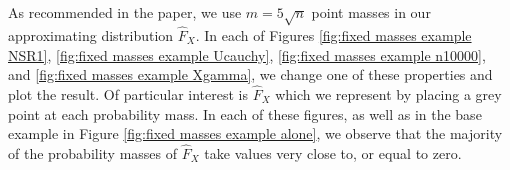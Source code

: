 	As recommended in the paper, we use $m = 5\sqrt{n}$ point masses in our approximating distribution $\hat{F}_X$. In each of Figures \ref{fig:fixed masses example NSR1}, \ref{fig:fixed masses example Ucauchy}, \ref{fig:fixed masses example n10000}, and \ref{fig:fixed masses example Xgamma}, we change one of these properties and plot the result. Of particular interest is $\hat{F}_X$ which we represent by placing a grey point at each probability mass. In each of these figures, as well as in the base example in Figure \ref{fig:fixed masses example alone}, we observe that the majority of the probability masses of $\hat{F}_X$ take values very close to, or equal to zero.


